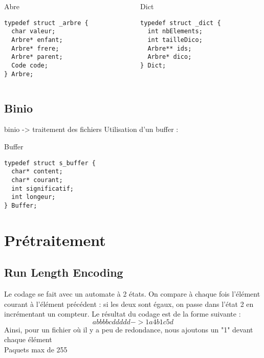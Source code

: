 \documentclass{beamer}
\begin{document}
\begin{frame}[containsverbatim]
\begin{columns}[t]
  \begin{column}{5cm}
  \begin{block}{Abre}
    \begin{lstlisting}
typedef struct _arbre {
  char valeur;
  Arbre* enfant;
  Arbre* frere;
  Arbre* parent;
  Code code;
} Arbre;
    \end{lstlisting}
  \end{block}
  \end{column}

  \begin{column}{5cm}
  \begin{block}{Dict}
    \begin{lstlisting}
typedef struct _dict {
  int nbElements;
  int tailleDico;
  Arbre** ids;
  Arbre* dico;
} Dict;
    \end{lstlisting}
  \end{block}
  \end{column}
 \end{columns}
\end{frame}


\subsection{Binio}
\begin{frame}[containsverbatim]
 binio -> traitement des fichiers\newline
 \newline
 Utilisation d'un buffer :
 \begin{block}{Buffer}
    \begin{lstlisting}
typedef struct s_buffer {
  char* content;
  char* courant;
  int significatif;
  int longeur;
} Buffer;
    \end{lstlisting}
  \end{block}


\end{frame}


\section{Prétraitement}

\subsection{Run Length Encoding}

\begin{frame}
Le codage se fait avec un automate à 2 états. On compare à chaque fois l'élément courant à l'élément précédent : si les deux sont égaux, on passe dans l'état 2 en incrémentant un compteur.
Le résultat du codage est de la forme suivante :\\
	$$abbbbcddddd -> 1a4b1c5d$$
Ainsi, pour un fichier où il y a peu de redondance, nous ajoutons un "1" devant chaque élément\\
Paquets max de 255
\end{frame}
\end{document}
